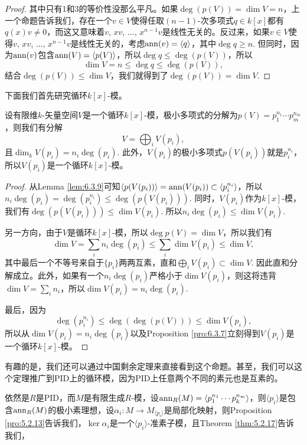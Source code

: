 \begin{proof}
    其中只有1和3的等价性没那么平凡。如果$\deg(p(V))=\dim V=n$，上一个命题告诉我们，存在一个$v\in V$使得任取$(n-1)$-次多项式$q\in k[x]$都有$q(x)v\neq 0$，而这又意味着$v$, $xv$, $\dots$, $x^{n-1}v$是线性无关的。反过来，如果$v\in V$使得$v$, $xv$, $\dots$, $x^{n-1}v$是线性无关的，考虑$\operatorname{ann}(v)=\langle q\rangle$，其中$\deg q\geq n$. 但同时，因为$\operatorname{ann}(v)$包含$\operatorname{ann}(V)=\langle p(V)\rangle$，所以$\deg q\leq \deg(p(V))$，所以
    \[
        \dim V=n\leq \deg q\leq \deg(p(V)),
    \]
    结合$\deg(p(V))\leq \dim V$，我们就得到了$\deg(p(V))=\dim V$.
\end{proof}

下面我们首先研究循环$k[x]$-模。

\begin{pro}
    设有限维$k$-矢量空间$V$是一个循环$k[x]$-模，极小多项式的分解为$p(V)=p_1^{n_1}\cdots p_m^{n_m}$，则我们有分解
    \[
       V=\bigoplus_i V(p_i),
    \]
    且$\dim_k V(p_i)=n_i\deg(p_i)$. 此外，$V(p_i)$的极小多项式$p(V(p_i))$就是$p_i^{n_i}$，所以$V(p_i)$是一个循环$k[x]$-模。
\end{pro}

\begin{proof}
    从Lemma \ref{lem:6.3.9}可知$\langle p(V(p_i))\rangle=\operatorname{ann} (V(p_i))\subset \langle p_i^{n_i}\rangle$，所以$n_i\deg(p_i)=\deg (p_i^{n_i})\leq \deg (p(V(p_i)))$. 同时，$V(p_i)$作为$k[x]$-模，我们有$\deg (p(V(p_i))) \leq \dim V(p_i)$. 所以$n_i\deg(p_i)\leq \dim V(p_i)$. 
    
    另一方向，由于$V$是循环$k[x]$-模，所以$\deg p(V)=\dim V$，所以我们有
    \[
        \dim V=\sum_i n_i\deg(p_i)\leq \sum_i\dim V(p_i)\leq \dim V,
    \]
    其中最后一个不等号来自于$\{p_i\}$两两互素，直和$\bigoplus_i V(p_i)\subset \dim V$. 因此直和分解成立。此外，如果有一个$n_i\deg(p_i)$严格小于$\dim V(p_i)$，则这将违背$\dim V=\sum_i n_i$，所以$\dim V(p_i)=n_i\deg(p_i)$.

    最后，因为
    \[
        \deg(p_i^{n_i})\leq \deg (\deg(p(V)))\leq \dim V(p_i),
    \]
    所以从$\dim V(p_i)=n_i\deg(p_i)$以及Proposition \ref{pro:6.3.7}立刻得到$V(p_i)$是一个循环$k[x]$-模。
\end{proof}

有趣的是，我们还可以通过中国剩余定理来直接看到这个命题。甚至，我们可以这个定理推广到PID上的循环模，因为PID上任意两个不同的素元也是互素的。

依然是$R$是PID，而$M$是有限生成$R$-模，设$\operatorname{ann}_R(M)=\langle p_1^{n_1}\cdots p_k^{n_m}\rangle$，则$\langle p_i\rangle$是包含$\operatorname{ann}_R(M)$的极小素理想，设$\alpha_i:M\to M_{\langle p_i\rangle}$是局部化映射，则Proposition \ref{pro:5.2.13}告诉我们，$\ker \alpha_i$是一个$\langle p_i\rangle$-准素子模，且Theorem \ref{thm:5.2.17}告诉我们，

